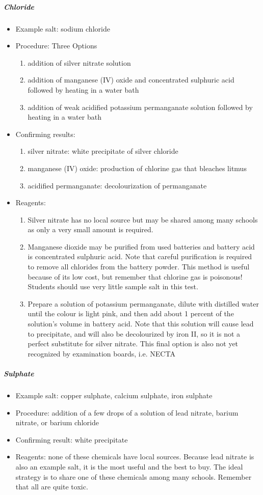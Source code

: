 \subparagraph{Chloride}
\begin{itemize}
\item{Example salt: sodium chloride}
\item{Procedure: Three Options
\begin{enumerate}
\item{addition of silver nitrate solution}
\item{addition of manganese (IV) oxide and concentrated sulphuric acid followed by heating in a water bath}
\item{addition of weak acidified potassium permanganate solution followed by heating in a water bath}
\end{enumerate}
} %
\item{Confirming results:
\begin{enumerate}
\item{silver nitrate: white precipitate of silver chloride} 
\item{manganese (IV) oxide: production of chlorine gas that bleaches litmus} 
\item{acidified permanganate: decolourization of permanganate}
\end{enumerate}
} %
\item{Reagents:
\begin{enumerate}
\item{Silver nitrate has no local source but may be shared among many schools as only a very small amount is required.}
\item{Manganese dioxide may be purified from used batteries and battery acid is concentrated sulphuric acid. Note that careful purification is required to remove all chlorides from the battery powder. This method is useful because of its low cost, but remember that chlorine gas is poisonous! Students should use very little sample salt in this test.}
\item{Prepare a solution of potassium permanganate, dilute with distilled water until the colour is light pink, and then add about 1 percent of the solution's volume in battery acid. Note that this solution will cause lead to precipitate, and will also be decolourized by iron II, so it is not a perfect substitute for silver nitrate. This final option is also not yet recognized by examination boards, i.e. NECTA}
\end{enumerate}
} %
\end{itemize}

\subparagraph{Sulphate}
\begin{itemize}
\item{Example salt: copper sulphate, calcium sulphate, iron sulphate}
\item{Procedure: addition of a few drops of a solution of lead nitrate, 
barium nitrate, or barium chloride}
\item{Confirming result: white precipitate}
\item{Reagents: none of these chemicals have local sources. Because lead nitrate is also an example salt, it is the most useful and the best to buy. The ideal strategy is to share one of these chemicals among many schools. Remember that all are quite toxic.}
\end{itemize}

